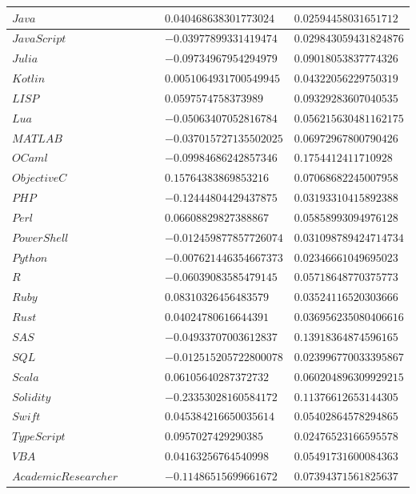 \documentclass{report}
\begin{document}
\begin{longtable}{|R{0.4\linewidth}|R{0.3\linewidth}|R{0.3\linewidth}|}
  \hline
  $Java$ & $0.040468638301773024$ & $0.02594458031651712$\\
  \hline
  $JavaScript$ & $-0.03977899331419474$ & $0.029843059431824876$\\
  \hline
  $Julia$ & $-0.09734967954294979$ & $0.09018053837774326$\\
  \hline
  $Kotlin$ & $0.0051064931700549945$ & $0.04322056229750319$\\
  \hline
  $LISP$ & $0.0597574758373989$ & $0.09329283607040535$\\
  \hline
  $Lua$ & $-0.05063407052816784$ & $0.056215630481162175$\\
  \hline
  $MATLAB$ & $-0.037015727135502025$ & $0.06972967800790426$\\
  \hline
  $OCaml$ & $-0.09984686242857346$ & $0.1754412411710928$\\
  \hline
  $ObjectiveC$ & $0.15764383869853216$ & $0.07068682245007958$\\
  \hline
  $PHP$ & $-0.12444804429437875$ & $0.03193310415892388$\\
  \hline
  $Perl$ & $0.06608829827388867$ & $0.05858993094976128$\\
  \hline
  $PowerShell$ & $-0.012459877857726074$ & $0.031098789424714734$\\
  \hline
  $Python$ & $-0.007621446354667373$ & $0.02346661049695023$\\
  \hline
  $R$ & $-0.06039083585479145$ & $0.05718648770375773$\\
  \hline
  $Ruby$ & $0.08310326456483579$ & $0.03524116520303666$\\
  \hline
  $Rust$ & $0.04024780616644391$ & $0.036956235080406616$\\
  \hline
  $SAS$ & $-0.04933707003612837$ & $0.13918364874596165$\\
  \hline
  $SQL$ & $-0.012515205722800078$ & $0.023996770033395867$\\
  \hline
  $Scala$ & $0.06105640287372732$ & $0.060204896309929215$\\
  \hline
  $Solidity$ & $-0.23353028160584172$ & $0.11376612653144305$\\
  \hline
  $Swift$ & $0.045384216650035614$ & $0.05402864578294865$\\
  \hline
  $TypeScript$ & $0.0957027429290385$ & $0.02476523166595578$\\
  \hline
  $VBA$ & $0.04163256764540998$ & $0.05491731600084363$\\
  \hline
  $AcademicResearcher$ & $-0.11486515699661672$ & $0.07394371561825637$\\

\end{longtable}
\end{document}
